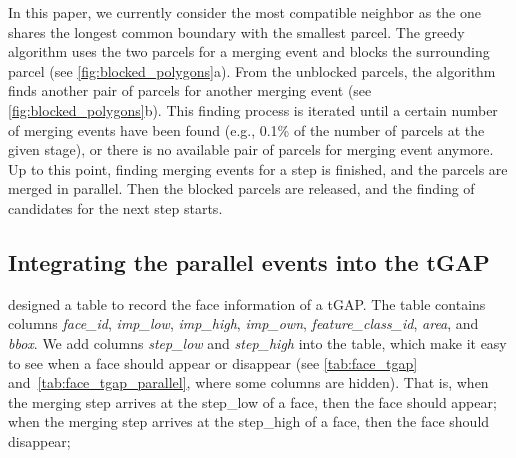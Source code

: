 \documentclass[ijgi,article,submit,moreauthors,pdftex]{Definitions/mdpi}
\begin{document}
In this paper, we currently consider the most compatible neighbor
as the one shares the longest common boundary with the smallest parcel.
The greedy algorithm uses the two parcels for a merging event
and blocks the surrounding parcel (see \fig\ref{fig:blocked_polygons}a).
From the unblocked parcels, the algorithm finds another pair of parcels
for another merging event
(see \fig\ref{fig:blocked_polygons}b).
This finding process is iterated 
until a certain number of merging events have been found 
(e.g., 0.1\% of the number of parcels at the given stage), 
or there is no available pair of parcels for merging event anymore.
Up to this point, finding merging events for a step is finished,
and the parcels are merged in parallel.
Then the blocked parcels are released, 
and the finding of candidates for the next step starts.



%
%

\subsection{Integrating the parallel events into the tGAP}

\citet[\fig5.9b]{Meijers2011Thesis} designed a table 
to record the face information of a tGAP.
The table contains columns \emph{face\_id}, 
\emph{imp\_low}, \emph{imp\_high}, \emph{imp\_own},
\emph{feature\_class\_id}, \emph{area}, and \emph{bbox}.
We add columns \emph{step\_low} and \emph{step\_high} into the table, 
which make it easy to see when a face should appear or disappear 
(see \tbls\ref{tab:face_tgap} and~\ref{tab:face_tgap_parallel},
where some columns are hidden).
That is, when the merging step arrives at the step\_low of a face,
then the face should appear;
when the merging step arrives at the step\_high of a face,
then the face should disappear;
\end{document}

